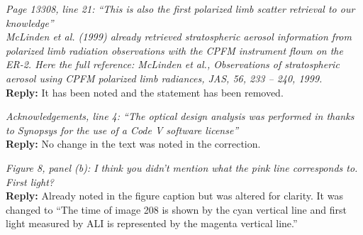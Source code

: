 \documentclass[12pt, notitlepage]{article}
\begin{document}
\hrulefill

\textit{Page 13308, line 21: ``This is also the first polarized limb scatter retrieval to our knowledge''}\\

\textit{McLinden et al. (1999) already retrieved stratospheric aerosol information from polarized
limb radiation observations with the CPFM instrument flown on the ER-2. Here
the full reference: McLinden et al., Observations of stratospheric aerosol using CPFM
polarized limb radiances, JAS, 56, 233 – 240, 1999.}\\

\textbf{Reply:} It has been noted and the statement has been removed.

\hrulefill

\textit{Acknowledgements, line 4: ``The optical design analysis was performed in thanks to Synopsys for the use of a Code V software license''}\\

\textbf{Reply:} No change in the text was noted in the correction.

\hrulefill

\textit{Figure 8, panel (b): I think you didn't mention what the pink line corresponds to. First
light?}\\

\textbf{Reply:} Already noted in the figure caption but was altered for clarity. It was changed to ``The time of image 208 is shown by the
  cyan vertical line and first light measured by ALI is represented by the
  magenta vertical line.''

\hrulefill
\end{document}
